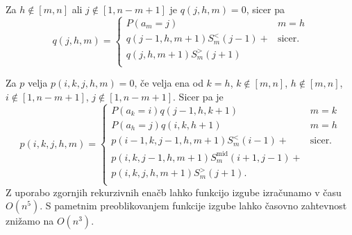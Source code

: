 \documentclass[mat2, tisk]{fmfdelo}
\begin{document}
Za $h \notin [m, n]$ ali $j \notin [1, n-m+1]$ je
$q(j,h,m) = 0$, sicer pa
%
$$
q(j, h, m) =
\begin{cases}
  P(a_m = j) & m = h \\
  q(j-1, h, m+1) S_m^<(j-1) +
  & \text{sicer.} \\
  q(j, h, m+1) S_m^>(j+1)&\\
\end{cases}
$$

Za $p$ velja $p(i, k, j, h, m) = 0$, če velja ena od $k=h$,
$k \notin [m, n]$, $h \notin [m, n]$, $i \notin [1,
n-m+1]$, $j \notin [1, n-m+1]$.
Sicer pa je
$$
p(i, k, j, h, m) =
\begin{cases}
  P(a_k = i) q(j-1, h, k+1) & m = k \\
  P(a_h = j) q(i, k, h+1) & m = h \\
  p(i-1, k, j-1, h, m+1) S_m^<(i-1) +
  &  \text{sicer.} \\
  p(i, k, j-1, h, m+1) S_m^{\text{mid}}(i+1, j-1) +
  &\\
  p(i, k, j, h, m+1) S_m^>(j+1).
  & \\
\end{cases}
$$
%
Z uporabo zgornjih rekurzivnih
enačb lahko funkcijo izgube izračunamo v času
$O(n^5)$. S pametnim preoblikovanjem funkcije izgube lahko
časovno zahtevnost znižamo na $O(n^3)$.
%
\end{document}
